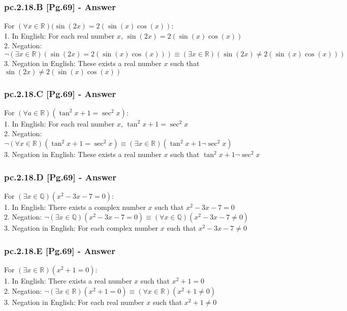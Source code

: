 \subsubsection*{pc.2.18.B [Pg.69] - Answer}
For $(\forall x \in \mathbb{R})(\sin(2x) = 2(\sin(x)\cos(x))$: \\
1. In English: For each real number $x$, $\sin(2x) = 2(\sin(x)\cos(x))$ \\
2. Negation: $\neg (\exists x \in \mathbb{R})(\sin(2x) = 2(\sin(x)\cos(x))) \equiv (\exists x \in \mathbb{R})(\sin(2x) \neq 2(\sin(x)\cos(x)))$ \\
3. Negation in English: These exists a real number $x$ such that $\sin(2x) \neq 2(\sin(x)\cos(x))$ \\

\subsubsection*{pc.2.18.C [Pg.69] - Answer}
For $(\forall a \in \mathbb{R})(\tan^2 x + 1 = \sec^2 x)$: \\
1. In English: For each real number $x$, $\tan^2 x + 1 = \sec^2 x$ \\
2. Negation: $\neg (\forall x \in \mathbb{R})(\tan^2 x + 1 = \sec^2 x) \equiv (\exists x \in \mathbb{R})(\tan^2 x + 1 \neg \sec^2 x)$ \\
3. Negation in English: These exists a real number $x$ such that $\tan^2 x + 1 \neg \sec^2 x$ \\

\subsubsection*{pc.2.18.D [Pg.69] - Answer}
For $(\exists x \in \mathbb{Q})(x^2 - 3x - 7 = 0)$: \\
1. In English: There exists a complex number $x$ such that $x^2 - 3x - 7 = 0$ \\
2. Negation: $\neg (\exists x \in \mathbb{Q})(x^2 - 3x - 7 = 0) \equiv (\forall x \in \mathbb{Q})(x^2 - 3x - 7 \neq 0)$ \\
3. Negation in English: For each complex number $x$ such that $x^2 - 3x - 7 \neq 0$ \\

\subsubsection*{pc.2.18.E [Pg.69] - Answer}
For $(\exists x \in \mathbb{R})(x^2 + 1 = 0)$: \\
1. In English: There exists a real number $x$ such that $x^2 + 1 = 0$ \\
2. Negation: $\neg (\exists x \in \mathbb{R})(x^2 + 1 = 0) \equiv (\forall x \in \mathbb{R})(x^2 + 1 \neq 0)$ \\
3. Negation in English: For each real number $x$ such that $x^2 + 1 \neq 0$ \\


